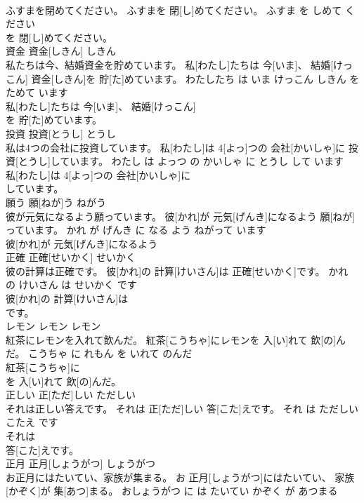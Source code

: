 \documentclass[8pt]{extreport}
\begin{document}
\begin{CJK}{UTF8}{min}
\\	ふすまを閉めてください。	ふすまを 閉[し]めてください。	ふすま を しめて ください	
\\	を 閉[し]めてください。		
\\	資金	資金[しきん]	しきん	
\\	私たちは今、結婚資金を貯めています。	私[わたし]たちは 今[いま]、 結婚[けっこん] 資金[しきん]を 貯[た]めています。	わたしたち は いま けっこん しきん を ためて います	
\\	私[わたし]たちは 今[いま]、 結婚[けっこん]
\\	を 貯[た]めています。		
\\	投資	投資[とうし]	とうし	
\\	私は4つの会社に投資しています。	私[わたし]は 4[よっ]つの 会社[かいしゃ]に 投資[とうし]しています。	わたし は よっつ の かいしゃ に とうし して います	
\\	私[わたし]は 4[よっ]つの 会社[かいしゃ]に
\\	しています。		
\\	願う	願[ねが]う	ねがう	
\\	彼が元気になるよう願っています。	彼[かれ]が 元気[げんき]になるよう 願[ねが]っています。	かれ が げんき に なる よう ねがって います	
\\	彼[かれ]が 元気[げんき]になるよう
\\	正確	正確[せいかく]	せいかく	
\\	彼の計算は正確です。	彼[かれ]の 計算[けいさん]は 正確[せいかく]です。	かれ の けいさん は せいかく です	
\\	彼[かれ]の 計算[けいさん]は
\\	です。		
\\	レモン	レモン	レモン	
\\	紅茶にレモンを入れて飲んだ。	紅茶[こうちゃ]にレモンを 入[い]れて 飲[の]んだ。	こうちゃ に れもん を いれて のんだ	
\\	紅茶[こうちゃ]に
\\	を 入[い]れて 飲[の]んだ。		
\\	正しい	正[ただ]しい	ただしい	
\\	それは正しい答えです。	それは 正[ただ]しい 答[こた]えです。	それ は ただしい こたえ です	
\\	それは
\\	答[こた]えです。		
\\	正月	正月[しょうがつ]	しょうがつ	
\\	お正月にはたいてい、家族が集まる。	お 正月[しょうがつ]にはたいてい、 家族[かぞく]が 集[あつ]まる。	おしょうがつ に は たいてい かぞく が あつまる	

\end{CJK}
\end{document}
